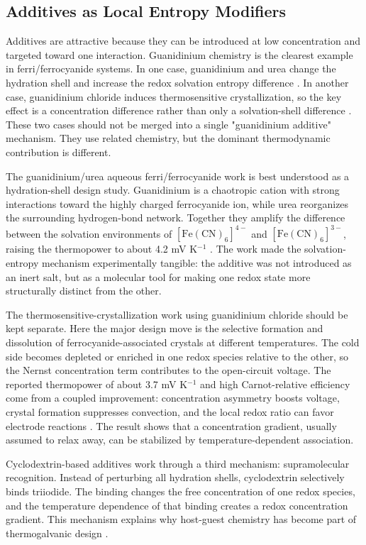 \subsection{Additives as Local Entropy Modifiers}

Additives are attractive because they can be introduced at low concentration
and targeted toward one interaction. Guanidinium chemistry is the clearest
example in ferri/ferrocyanide systems. In one case, guanidinium and urea
change the hydration shell and increase the redox solvation entropy difference
\citep{duan2018aqueous}. In another case, guanidinium chloride induces
thermosensitive crystallization, so the key effect is a concentration
difference rather than only a solvation-shell difference
\citep{yu2020thermosensitive}. These two cases should not be merged into a
single "guanidinium additive" mechanism. They use related chemistry, but the
dominant thermodynamic contribution is different.

The guanidinium/urea aqueous ferri/ferrocyanide work is best understood as a
hydration-shell design study. Guanidinium is a chaotropic cation with strong
interactions toward the highly charged ferrocyanide ion, while urea reorganizes
the surrounding hydrogen-bond network. Together they amplify the difference
between the solvation environments of $[\mathrm{Fe(CN)}_6]^{4-}$ and
$[\mathrm{Fe(CN)}_6]^{3-}$, raising the thermopower to about 4.2 mV K$^{-1}$
\citep{duan2018aqueous}. The work made the
solvation-entropy mechanism experimentally tangible: the additive was not
introduced as an inert salt, but as a molecular tool for making one redox state
more structurally distinct from the other.

The thermosensitive-crystallization work using guanidinium chloride should be
kept separate. Here the major design move is the selective formation and
dissolution of ferrocyanide-associated crystals at different temperatures. The
cold side becomes depleted or enriched in one redox species relative to the
other, so the Nernst concentration term contributes to the open-circuit
voltage. The reported thermopower of about 3.7 mV K$^{-1}$ and high
Carnot-relative efficiency come from a coupled improvement: concentration
asymmetry boosts voltage, crystal formation suppresses convection, and the
local redox ratio can favor electrode reactions \citep{yu2020thermosensitive}.
The result shows that a concentration gradient, usually assumed to relax away,
can be stabilized by temperature-dependent association.

Cyclodextrin-based additives work through a third mechanism: supramolecular
recognition. Instead of perturbing all hydration shells, cyclodextrin
selectively binds triiodide. The binding changes the free concentration of one
redox species, and the temperature dependence of that binding creates a redox
concentration gradient. This mechanism explains why host-guest chemistry has
become part of thermogalvanic design
\citep{zhou2016supramolecular}.

